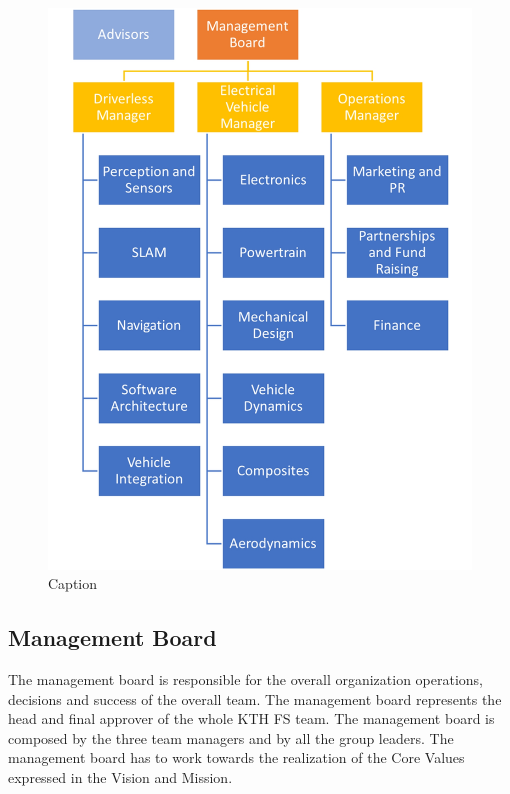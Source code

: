 \documentclass[graybox]{svmult}
\begin{document}
\begin{figure}
    \centering
    \includegraphics[scale=.50]{organigramma.jpg}
    \caption{Caption}
    \label{fig:my_label}
\end{figure}

\subsection{Management Board}
The management board is responsible for the overall organization operations, decisions and success of the overall team. The management board represents the head and final approver of the whole KTH FS team. The management board is composed by the three team managers and by all the group leaders. The management board has to work towards the realization of the Core Values expressed in the Vision and Mission.
\end{document}
